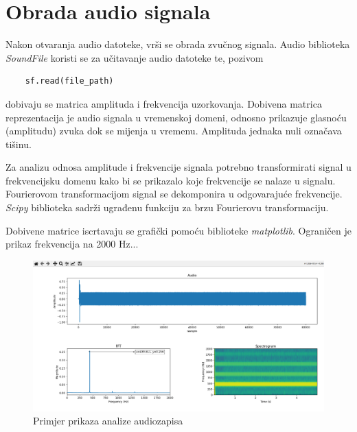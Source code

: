 \chapter{Obrada audio signala}

Nakon otvaranja audio datoteke, vrši se obrada zvučnog signala. Audio biblioteka \textit{SoundFile} koristi se za učitavanje audio datoteke te, pozivom 
\begin{lstlisting}
	sf.read(file_path)
\end{lstlisting}	

dobivaju se matrica amplituda i frekvencija uzorkovanja. Dobivena matrica reprezentacija je audio signala u vremenskoj domeni, odnosno prikazuje glasnoću (amplitudu) zvuka dok se mijenja u vremenu. Amplituda jednaka nuli označava tišinu.

Za analizu odnosa amplitude i frekvencije signala potrebno transformirati signal u frekvencijsku domenu kako bi se prikazalo koje frekvencije se nalaze u signalu. Fourierovom transformacijom signal se dekomponira u odgovarajuće frekvencije. \textit{Scipy} biblioteka sadrži ugrađenu funkciju za brzu Fourierovu transformaciju.




Dobivene matrice iscrtavaju se grafički pomoću biblioteke \textit{matplotlib}. Ograničen je prikaz frekvencija na 2000 Hz...


\begin{figure}[ht]
	\includegraphics[width=\linewidth]{imgs/analyse_example}
	\caption{Primjer prikaza analize audiozapisa}
	\label{fig:analyse_example}
\end{figure}
